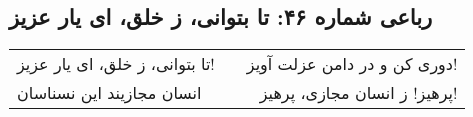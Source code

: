 \begin{center}
\section*{رباعی شماره ۴۶: تا بتوانی، ز خلق، ای یار عزیز}
\label{sec:046}
\begin{longtable}{l p{0.5cm} r}
تا بتوانی، ز خلق، ای یار عزیز!
&&
دوری کن و در دامن عزلت آویز!
\\
انسان مجازیند این نسناسان
&&
پرهیز! ز انسان مجازی، پرهیز!
\\
\end{longtable}
\end{center}
